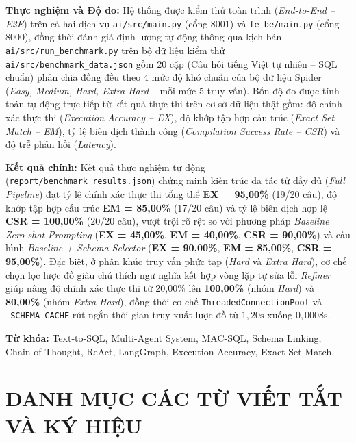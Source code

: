 \documentclass[12pt,a4paper]{report}
\begin{document}
\noindent\textbf{Thực nghiệm và Độ đo:} Hệ thống được kiểm thử toàn trình (\textit{End-to-End -- E2E}) trên cả hai dịch vụ \texttt{ai/src/main.py} (cổng 8001) và \texttt{fe\_be/main.py} (cổng 8000), đồng thời đánh giá định lượng tự động thông qua kịch bản \texttt{ai/src/run\_benchmark.py} trên bộ dữ liệu kiểm thử \texttt{ai/src/benchmark\_data.json} gồm 20 cặp (Câu hỏi tiếng Việt tự nhiên -- SQL chuẩn) phân chia đồng đều theo 4 mức độ khó chuẩn của bộ dữ liệu Spider \cite{yu2018spider} (\textit{Easy, Medium, Hard, Extra Hard} -- mỗi mức 5 truy vấn). Bốn độ đo được tính toán tự động trực tiếp từ kết quả thực thi trên cơ sở dữ liệu thật gồm: độ chính xác thực thi (\textit{Execution Accuracy -- EX}), độ khớp tập hợp cấu trúc (\textit{Exact Set Match -- EM}), tỷ lệ biên dịch thành công (\textit{Compilation Success Rate -- CSR}) và độ trễ phản hồi (\textit{Latency}).

\noindent\textbf{Kết quả chính:} Kết quả thực nghiệm tự động (\texttt{report/benchmark\_results.json}) chứng minh kiến trúc đa tác tử đầy đủ (\textit{Full Pipeline}) đạt tỷ lệ chính xác thực thi tổng thể \textbf{EX = 95,00\%} (19/20 câu), độ khớp tập hợp cấu trúc \textbf{EM = 85,00\%} (17/20 câu) và tỷ lệ biên dịch hợp lệ \textbf{CSR = 100,00\%} (20/20 câu), vượt trội rõ rệt so với phương pháp \textit{Baseline Zero-shot Prompting} (\textbf{EX = 45,00\%}, \textbf{EM = 40,00\%}, \textbf{CSR = 90,00\%}) và cấu hình \textit{Baseline + Schema Selector} (\textbf{EX = 90,00\%}, \textbf{EM = 85,00\%}, \textbf{CSR = 95,00\%}). Đặc biệt, ở phân khúc truy vấn phức tạp (\textit{Hard} và \textit{Extra Hard}), cơ chế chọn lọc lược đồ giàu chú thích ngữ nghĩa kết hợp vòng lặp tự sửa lỗi \textit{Refiner} giúp nâng độ chính xác thực thi từ 20,00\% lên \textbf{100,00\%} (nhóm \textit{Hard}) và \textbf{80,00\%} (nhóm \textit{Extra Hard}), đồng thời cơ chế \texttt{ThreadedConnectionPool} và \texttt{\_SCHEMA\_CACHE} rút ngắn thời gian truy xuất lược đồ từ $1{,}20\text{s}$ xuống $0{,}0008\text{s}$.

\vspace{0.3cm}
\noindent\textbf{Từ khóa:} Text-to-SQL, Multi-Agent System, MAC-SQL, Schema Linking, Chain-of-Thought, ReAct, LangGraph, Execution Accuracy, Exact Set Match.

\newpage
\tableofcontents
\newpage
\listoffigures
{}
\newpage
\listoftables
{}

\newpage
\chapter*{DANH MỤC CÁC TỪ VIẾT TẮT VÀ KÝ HIỆU}
\end{document}
